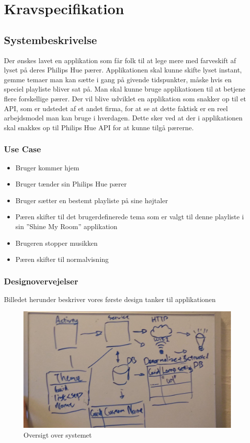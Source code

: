 	\chapter{Kravspecifikation}
	
		\section{Systembeskrivelse}
		Der ønskes lavet en applikation som får folk til at lege mere med farveskift af lyset på deres Philips Hue pærer.
		Applikationen skal kunne skifte lyset instant, gemme temaer man kan sætte i gang på givende tidspunkter, måske hvis en speciel playliste bliver sat på. Man skal kunne bruge applikationen til at betjene flere forskellige pærer.
		Der vil blive udviklet en applikation som snakker op til et API, som er udstedet af et andet firma, for at se at dette faktisk er en reel arbejdsmodel man kan bruge i hverdagen.
		Dette sker ved at der i applikationen skal snakkes op til Philips Hue API for at kunne tilgå pærerne.
		\newline
		
		\subsection{Use Case}
		\begin{itemize}
			\item Bruger kommer hjem
			\item Bruger tænder sin Philips Hue pærer
			\item Bruger sætter en bestemt playliste på sine højtaler
			\item Pæren skifter til det brugerdefinerede tema som er valgt til denne playliste i sin ”Shine My Room” applikation
			\item Brugeren stopper musikken
			\item Pæren skifter til normalvisning \newline
		\end{itemize}
	
		\subsection{Designovervejelser}
		Billedet herunder beskriver vores første design tanker til applikationen
		\begin{figure}[H]
			\centering
			\includegraphics[width=0.6\linewidth]{Kravspecifikation/Designovervejelser}
			\caption{Oversigt over systemet}
			\label{fig:Designovervejelser}
		\end{figure}
		\newpage
	
